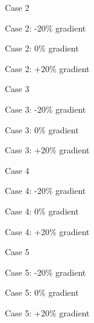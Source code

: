 \begin{frame}{Case 2}
\end{frame}

\begin{frame}{Case 2: -20\% gradient}
\end{frame}
\begin{frame}{Case 2: 0\% gradient}
\end{frame}
\begin{frame}{Case 2: +20\% gradient}
\end{frame}


\begin{frame}{Case 3}
\end{frame}

\begin{frame}{Case 3: -20\% gradient}
\end{frame}
\begin{frame}{Case 3: 0\% gradient}
\end{frame}
\begin{frame}{Case 3: +20\% gradient}
\end{frame}


\begin{frame}{Case 4}
\end{frame}

\begin{frame}{Case 4: -20\% gradient}
\end{frame}
\begin{frame}{Case 4: 0\% gradient}
\end{frame}
\begin{frame}{Case 4: +20\% gradient}
\end{frame}


\begin{frame}{Case 5}
\end{frame}

\begin{frame}{Case 5: -20\% gradient}
\end{frame}
\begin{frame}{Case 5: 0\% gradient}
\end{frame}
\begin{frame}{Case 5: +20\% gradient}
\end{frame}





